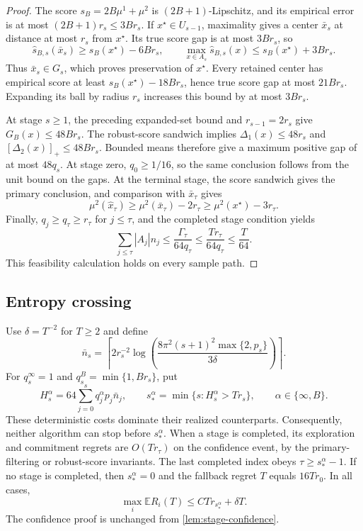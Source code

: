 \documentclass[11pt]{article}
\theoremstyle{definition}
\newcommand{\E}{\mathbb E}
\begin{document}
\begin{proof}
The score $s_B=2B\mu^1+\mu^2$ is $(2B+1)$-Lipschitz, and its
empirical error is at most $(2B+1)r_s\le3Br_s$. If
$x^\star\in U_{s-1}$, maximality gives a center $\bar x_s$ at distance
at most $r_s$ from $x^\star$. Its true score gap is at most $3Br_s$,
so
\[
 \widehat s_{B,s}(\bar x_s)\ge s_B(x^\star)-6Br_s,
 \qquad
 \max_{x\in A_s}\widehat s_{B,s}(x)
 \le s_B(x^\star)+3Br_s.
\]
Thus $\bar x_s\in G_s$, which proves preservation of $x^\star$.
Every retained center has empirical score at least
$s_B(x^\star)-18Br_s$, hence true score gap at most $21Br_s$.
Expanding its ball by radius $r_s$ increases this bound by at most
$3Br_s$.

At stage $s\ge1$, the preceding expanded-set bound and
$r_{s-1}=2r_s$ give $G_B(x)\le48Br_s$. The robust-score sandwich
implies $\Delta_1(x)\le48r_s$ and
$[\Delta_2(x)]_+\le48Br_s$. Bounded means therefore give a maximum
positive gap of at most $48q_s$. At stage zero, $q_0\ge1/16$, so the
same conclusion follows from the unit bound on the gaps. At the
terminal stage, the score sandwich gives the primary conclusion,
and comparison with $\bar x_\tau$ gives
\[
 \mu^2(\widehat x_\tau)
 \ge\mu^2(\bar x_\tau)-2r_\tau
 \ge\mu^2(x^\star)-3r_\tau.
\]
Finally, $q_j\ge q_\tau\ge r_\tau$ for $j\le\tau$, and the completed
stage condition yields
\[
 \sum_{j\le\tau}|A_j|n_j
 \le\frac{\Gamma_\tau}{64q_\tau}
 \le\frac{Tr_\tau}{64q_\tau}\le\frac T{64}.
\]
This feasibility calculation holds on every sample path.
\end{proof}

\subsection{Entropy crossing}

Use $\delta=T^{-2}$ for $T\ge2$ and define
\[
 \bar n_s=\left\lceil2r_s^{-2}\log\!\left(
 \frac{8\pi^2(s+1)^2\max\{2,p_s\}}{3\delta}\right)\right\rceil.
\]
For $q_s^\infty=1$ and $q_s^B=\min\{1,Br_s\}$, put
\[
 H_s^\alpha=64\sum_{j=0}^s q_j^\alpha p_j\bar n_j,
 \qquad
 s_*^\alpha=\min\{s:H_s^\alpha>Tr_s\},
 \qquad \alpha\in\{\infty,B\}.
\]
These deterministic costs dominate their realized counterparts.
Consequently, neither algorithm can stop before $s_*^\alpha$.
When a stage is completed, its exploration and commitment regrets
are $O(Tr_\tau)$ on the confidence event, by the primary-filtering or
robust-score invariants. The last completed index obeys
$\tau\ge s_*^\alpha-1$. If no stage is completed, then
$s_*^\alpha=0$ and the fallback regret $T$ equals $16Tr_0$.
In all cases,
\begin{equation}
\label{eq:entropy-crossing-risk}
 \max_i\E R_i(T)\le CTr_{s_*^\alpha}+\delta T.
\end{equation}
The confidence proof is unchanged from
\cref{lem:stage-confidence}.
\end{document}
